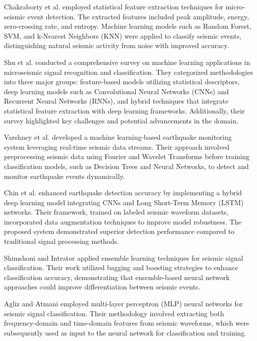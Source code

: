 \documentclass[conference]{IEEEtran}
\begin{document}
Chakraborty et al. \cite{b3} employed statistical feature extraction
techniques for micro-seismic event detection. The extracted features included
peak amplitude, energy, zero-crossing rate, and entropy. Machine learning models
such as Random Forest, SVM, and k-Nearest Neighbors (KNN) were applied to
classify seismic events, distinguishing natural seismic activity from noise with
improved accuracy.


Shu et al. \cite{b4} conducted a comprehensive survey on
machine learning applications in microseismic signal recognition and
classification. They categorized methodologies into three major groups:
feature-based models utilizing statistical descriptors, deep learning models
such as Convolutional Neural Networks (CNNs) and Recurrent Neural Networks
(RNNs), and hybrid techniques that integrate statistical feature extraction with
deep learning frameworks. Additionally, their survey highlighted key challenges
and potential advancements in the domain.


Varshney et al. \cite{b5} developed a
machine learning-based earthquake monitoring system leveraging real-time seismic
data streams. Their approach involved preprocessing seismic data using Fourier
and Wavelet Transforms before training classification models, such as Decision
Trees and Neural Networks, to detect and monitor earthquake events dynamically.


Chin et al. \cite{b6} enhanced earthquake detection accuracy by implementing a
hybrid deep learning model integrating CNNs and Long Short-Term Memory (LSTM)
networks. Their framework, trained on labeled seismic waveform datasets,
incorporated data augmentation techniques to improve model robustness. The
proposed system demonstrated superior detection performance compared to
traditional signal processing methods.


Shimshoni and Intrator \cite{b7} applied
ensemble learning techniques for seismic signal classification. Their work
utilized bagging and boosting strategies to enhance classification accuracy,
demonstrating that ensemble-based neural network approaches could improve
differentiation between seismic events.


Agliz and Atmani \cite{b8} employed
multi-layer perceptron (MLP) neural networks for seismic signal classification.
Their methodology involved extracting both frequency-domain and time-domain
features from seismic waveforms, which were subsequently used as input to the
neural network for classification and training.
\end{document}
